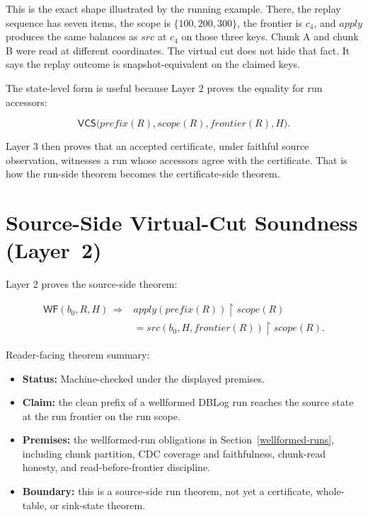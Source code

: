 \documentclass[letterpaper,10pt,twocolumn]{article}
\newcommand{\restrict}{\mathbin{\upharpoonright}}
\newcommand{\Apply}{\mathit{apply}}
\newcommand{\Src}{\mathit{src}}
\newcommand{\Scope}{\mathit{scope}}
\newcommand{\Frontier}{\mathit{frontier}}
\newcommand{\CleanPrefix}{\mathit{prefix}}
\newcommand{\WF}{\mathsf{WF}}
\newcommand{\VCS}{\mathsf{VCS}}
\providecommand{\tightlist}{\setlength{\itemsep}{0pt}\setlength{\parskip}{0pt}}
\begin{document}
\begin{figure}[ht]
  
\end{figure}

This is the exact shape illustrated by the running example. There, the
replay sequence has seven items, the scope is
$\{100,200,300\}$, the frontier is $c_4$, and
$\Apply$ produces the same balances as $\Src$ at $c_4$
on those three keys. Chunk A and chunk B were read at different
coordinates. The virtual cut does not hide that fact. It says the replay
outcome is snapshot-equivalent on the claimed keys.

The state-level form is useful because Layer 2 proves the equality for
run accessors:

\[
  \VCS\bigl(\CleanPrefix(R),\Scope(R),\Frontier(R),H\bigr).
\]

Layer 3 then proves that an accepted certificate, under faithful source
observation, witnesses a run whose accessors agree with the certificate.
That is how the run-side theorem becomes the certificate-side theorem.

\section{Source-Side Virtual-Cut Soundness \mbox{(Layer 2)}}\label{source-side-virtual-cut-soundness-layer-2}

Layer 2 proves the source-side theorem:

\[
\begin{aligned}
  \WF(b_0,R,H) \,\Longrightarrow{}&
    \Apply(\CleanPrefix(R)) \restrict \Scope(R)\\
  &{}= \Src(b_0,H,\Frontier(R)) \restrict \Scope(R).
\end{aligned}
\]

Reader-facing theorem summary:

\begin{itemize}
\tightlist
\item
  \textbf{Status:} Machine-checked under the displayed
  premises.
\item
  \textbf{Claim:} the clean prefix of a wellformed DBLog run reaches the
  source state at the run frontier on the run scope.
\item
  \textbf{Premises:} the wellformed-run obligations in
  Section~\ref{wellformed-runs},
  including chunk partition, CDC coverage and faithfulness, chunk-read
  honesty, and read-before-frontier discipline.
\item
  \textbf{Boundary:} this is a source-side run theorem, not yet a
  certificate, whole-table, or sink-state theorem.
\end{itemize}
\end{document}
